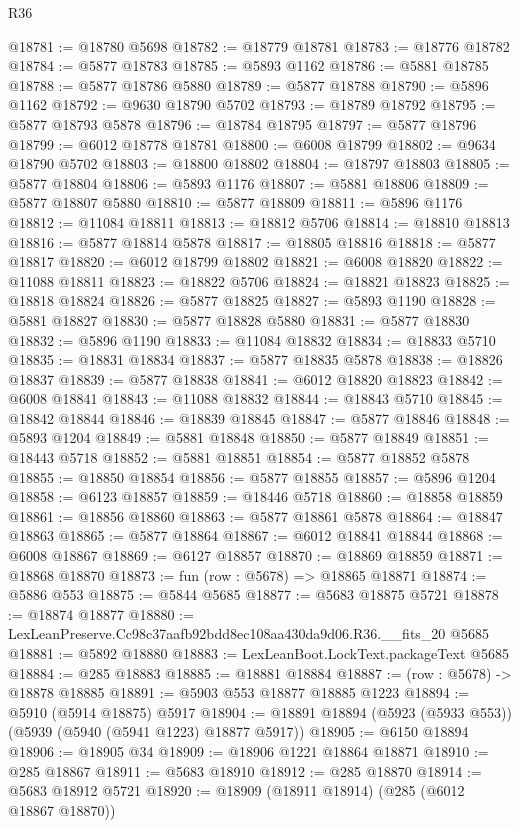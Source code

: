 \begin{lexlean}{R36}
\begin{coremodule}
@18781 := @18780 @5698
@18782 := @18779 @18781
@18783 := @18776 @18782
@18784 := @5877 @18783
@18785 := @5893 @1162
@18786 := @5881 @18785
@18788 := @5877 @18786 @5880
@18789 := @5877 @18788
@18790 := @5896 @1162
@18792 := @9630 @18790 @5702
@18793 := @18789 @18792
@18795 := @5877 @18793 @5878
@18796 := @18784 @18795
@18797 := @5877 @18796
@18799 := @6012 @18778 @18781
@18800 := @6008 @18799
@18802 := @9634 @18790 @5702
@18803 := @18800 @18802
@18804 := @18797 @18803
@18805 := @5877 @18804
@18806 := @5893 @1176
@18807 := @5881 @18806
@18809 := @5877 @18807 @5880
@18810 := @5877 @18809
@18811 := @5896 @1176
@18812 := @11084 @18811
@18813 := @18812 @5706
@18814 := @18810 @18813
@18816 := @5877 @18814 @5878
@18817 := @18805 @18816
@18818 := @5877 @18817
@18820 := @6012 @18799 @18802
@18821 := @6008 @18820
@18822 := @11088 @18811
@18823 := @18822 @5706
@18824 := @18821 @18823
@18825 := @18818 @18824
@18826 := @5877 @18825
@18827 := @5893 @1190
@18828 := @5881 @18827
@18830 := @5877 @18828 @5880
@18831 := @5877 @18830
@18832 := @5896 @1190
@18833 := @11084 @18832
@18834 := @18833 @5710
@18835 := @18831 @18834
@18837 := @5877 @18835 @5878
@18838 := @18826 @18837
@18839 := @5877 @18838
@18841 := @6012 @18820 @18823
@18842 := @6008 @18841
@18843 := @11088 @18832
@18844 := @18843 @5710
@18845 := @18842 @18844
@18846 := @18839 @18845
@18847 := @5877 @18846
@18848 := @5893 @1204
@18849 := @5881 @18848
@18850 := @5877 @18849
@18851 := @18443 @5718
@18852 := @5881 @18851
@18854 := @5877 @18852 @5878
@18855 := @18850 @18854
@18856 := @5877 @18855
@18857 := @5896 @1204
@18858 := @6123 @18857
@18859 := @18446 @5718
@18860 := @18858 @18859
@18861 := @18856 @18860
@18863 := @5877 @18861 @5878
@18864 := @18847 @18863
@18865 := @5877 @18864
@18867 := @6012 @18841 @18844
@18868 := @6008 @18867
@18869 := @6127 @18857
@18870 := @18869 @18859
@18871 := @18868 @18870
@18873 := fun (row : @5678) => @18865 @18871
@18874 := @5886 @553
@18875 := @5844 @5685
@18877 := @5683 @18875 @5721
@18878 := @18874 @18877
@18880 := LexLeanPreserve.Cc98c37aafb92bdd8ec108aa430da9d06.R36.__fits_20 @5685
@18881 := @5892 @18880
@18883 := LexLeanBoot.LockText.packageText @5685
@18884 := @285 @18883
@18885 := @18881 @18884
@18887 := (row : @5678) -> @18878 @18885
@18891 := @5903 @553 @18877 @18885 @1223
@18894 := @5910 (@5914 @18875) @5917
@18904 := @18891 @18894 (@5923 (@5933 @553)) (@5939 (@5940 (@5941 @1223) @18877 @5917))
@18905 := @6150 @18894
@18906 := @18905 @34
@18909 := @18906 @1221 @18864 @18871
@18910 := @285 @18867
@18911 := @5683 @18910
@18912 := @285 @18870
@18914 := @5683 @18912 @5721
@18920 := @18909 (@18911 @18914) (@285 (@6012 @18867 @18870))

\end{coremodule}
\end{lexlean}
